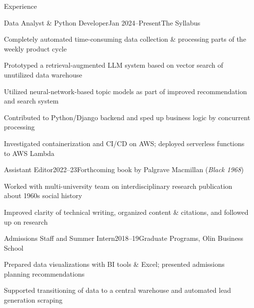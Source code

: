   \begin{rSection}{Experience}

    \begin{rSubsection}{Data Analyst \& Python Developer}{Jan 2024--Present}{The Syllabus}{}%
    \item Completely automated time-consuming data collection \& processing parts of the weekly product cycle
    \item Prototyped a retrieval-augmented LLM system based on vector search of unutilized data warehouse
    \item Utilized neural-network-based topic models as part of improved recommendation and search system
    \item Contributed to Python/Django backend and sped up business logic by concurrent processing 
    \item Investigated containerization and CI/CD on AWS; deployed serverless functions to AWS Lambda
    \end{rSubsection}

    \begin{rSubsection}{Assistant Editor}{2022--23}{Forthcoming book by Palgrave Macmillan (\emph{Black 1968})}{}%
    \item Worked with multi-university team on interdisciplinary research publication about 1960s social history
    \item Improved clarity of technical writing, organized content \& citations, and followed up on research
    \end{rSubsection}

    \begin{rSubsection}{Admissions Staff and Summer Intern}{2018--19}{Graduate Programs, Olin Business School}{}%
    \item Prepared data visualizations with BI tools \& Excel; presented admissions planning recommendations
    \item Supported transitioning of data to a central warehouse and automated lead generation scraping
    \end{rSubsection}


\end{rSection}
